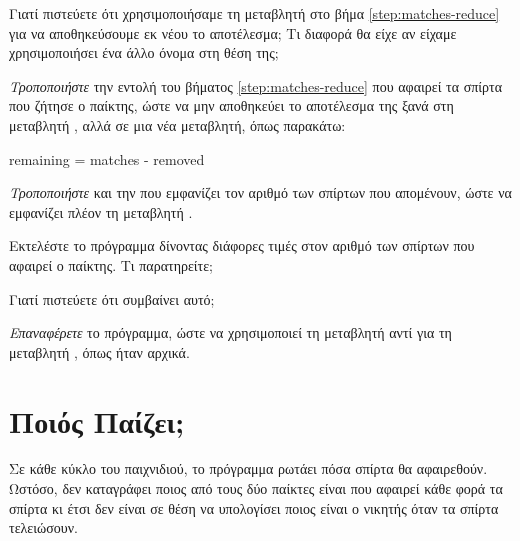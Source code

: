 \documentclass[a4paper,11pt,oneside]{book}
\begin{document}
\begin{step}
Γιατί πιστεύετε ότι χρησιμοποιήσαμε τη μεταβλητή  στο βήμα \ref{step:matches-reduce} για να αποθηκεύσουμε εκ νέου το αποτέλεσμα; Τι διαφορά θα είχε αν είχαμε χρησιμοποιήσει ένα άλλο όνομα στη θέση της;

\marginnote[14pt]{\icondiscuss}
\dottedline

\dottedline

\emph{Τροποποιήστε} την εντολή του βήματος \ref{step:matches-reduce} που αφαιρεί τα σπίρτα που ζήτησε ο παίκτης, ώστε να μην αποθηκεύει το αποτέλεσμα της ξανά στη μεταβλητή , αλλά σε μια νέα μεταβλητή, όπως παρακάτω:

\begin{pynew}
remaining = matches - removed
\end{pynew}

\emph{Τροποποιήστε} και την  που εμφανίζει τον αριθμό των σπίρτων που απομένουν, ώστε να εμφανίζει πλέον τη μεταβλητή .

Εκτελέστε το πρόγραμμα δίνοντας διάφορες τιμές στον αριθμό των σπίρτων που αφαιρεί ο παίκτης.
Τι παρατηρείτε;

\clearpage
\marginnote[14pt]{\icondiscuss}

\dottedline

\dottedline

Γιατί πιστεύετε ότι συμβαίνει αυτό;

\marginnote[14pt]{\icondiscuss}
\dottedline

\dottedline

\emph{Επαναφέρετε} το πρόγραμμα, ώστε να χρησιμοποιεί τη μεταβλητή  αντί για τη μεταβλητή , όπως ήταν αρχικά.
\end{step}

\section{Ποιός Παίζει;}
Σε κάθε κύκλο του παιχνιδιού, το πρόγραμμα ρωτάει πόσα σπίρτα θα αφαιρεθούν. Ωστόσο, δεν καταγράφει ποιος από τους δύο παίκτες είναι που αφαιρεί κάθε φορά τα σπίρτα κι έτσι δεν είναι σε θέση να υπολογίσει ποιος είναι ο νικητής όταν τα σπίρτα τελειώσουν.
\end{document}
